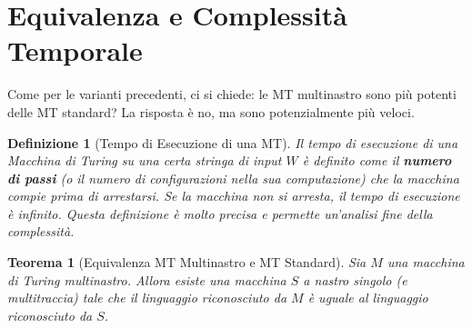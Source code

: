 \documentclass[a4paper]{article}
\newtheorem{theorem}{Teorema}
\newtheorem{definition}{Definizione}
\begin{document}
\section{Equivalenza e Complessità Temporale}
Come per le varianti precedenti, ci si chiede: le MT multinastro sono più potenti delle MT standard? La risposta è no, ma sono potenzialmente più veloci.

\begin{definition}[Tempo di Esecuzione di una MT]
Il tempo di esecuzione di una Macchina di Turing su una certa stringa di input $W$ è definito come il \textbf{numero di passi} (o il numero di configurazioni nella sua computazione) che la macchina compie prima di arrestarsi. Se la macchina non si arresta, il tempo di esecuzione è infinito. Questa definizione è molto precisa e permette un'analisi fine della complessità.
\end{definition}

\begin{theorem}[Equivalenza MT Multinastro e MT Standard]
Sia $M$ una macchina di Turing multinastro. Allora esiste una macchina $S$ a nastro singolo (e multitraccia) tale che il linguaggio riconosciuto da $M$ è uguale al linguaggio riconosciuto da $S$.
\end{theorem}
\end{document}
